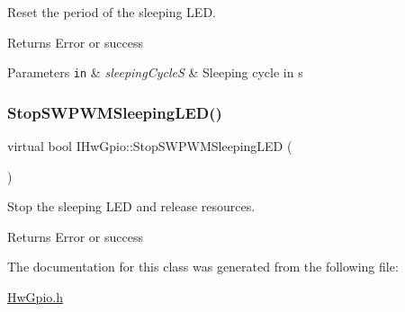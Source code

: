 Reset the period of the sleeping L\+ED. 

\begin{DoxyReturn}{Returns}
Error or success 
\end{DoxyReturn}

\begin{DoxyParams}[1]{Parameters}
\mbox{\tt in}  & {\em sleeping\+CycleS} & Sleeping cycle in s \\
\hline
\end{DoxyParams}
\mbox{\label{classIHwGpio_a765a2ec2a649074f0cd9e90e8148fbf7}} 
\subsubsection{\texorpdfstring{Stop\+S\+W\+P\+W\+M\+Sleeping\+L\+E\+D()}{StopSWPWMSleepingLED()}}
{\footnotesize\ttfamily virtual bool I\+Hw\+Gpio\+::\+Stop\+S\+W\+P\+W\+M\+Sleeping\+L\+ED (\begin{DoxyParamCaption}{ }\end{DoxyParamCaption})\hspace{0.3cm}{\ttfamily [pure virtual]}}



Stop the sleeping L\+ED and release resources. 

\begin{DoxyReturn}{Returns}
Error or success 
\end{DoxyReturn}


The documentation for this class was generated from the following file\+:\begin{DoxyCompactItemize}
\item 
\hyperlink{HwGpio_8h}{Hw\+Gpio.\+h}\end{DoxyCompactItemize}
